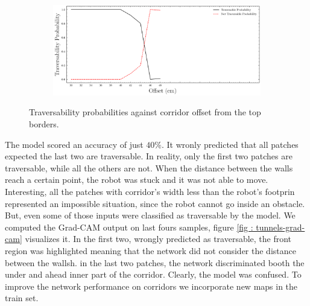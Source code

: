 \documentclass[../document.tex]{subfiles}
\begin{document}
\begin{figure}[htbp]
    \centering
\begin{subfigure}[b]{1\linewidth}
    \includegraphics[width=\linewidth]{../img/5/custom_patches/tunnel/predictions.png}
    \end{subfigure}
    \caption{Traversability probabilities against corridor offset from the top borders.}
    \label{fig : tunnels-preds}
\end{figure}
The model scored an accuracy of just $40\%$. It wronly predicted that all patches expected the last two are traversable. In reality, only the first two patches are traversable, while all the others are not. When the distance between the walls reach a certain point, the robot was stuck and it was not able to move. Interesting, all the patches with corridor's width less than the robot's footprin represented an impossible situation, since the robot cannot go inside an obstacle. But, even some of those inputs were classified as traversable by the model. We computed the Grad-CAM output on last fours samples, figure \ref{fig : tunnels-grad-cam} visualizes it. In the first two, wrongly predicted as traversable, the front region was highlighted meaning that the network did not consider the distance between the wallsh. in the last two patches, the network discriminated booth the under and ahead inner part of the corridor. Clearly, the model was confused. To improve the network performance on corridors we incorporate new maps in the train set.
\end{document}
